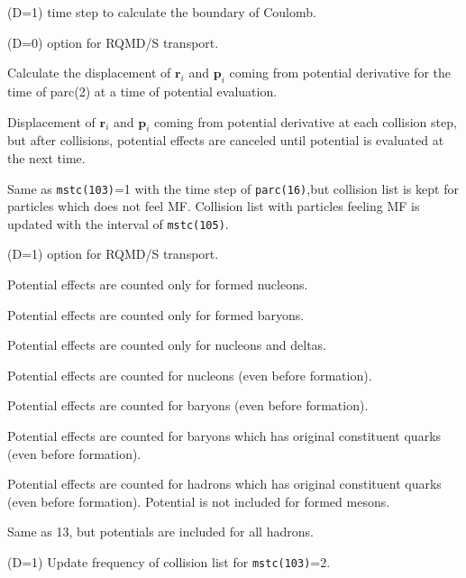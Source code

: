 \documentclass[]{article}
\newenvironment{entry}%
{\begin{list}{}{\setlength{\topsep}{0mm} \setlength{\itemsep}{0mm}
\setlength{\parskip}{0mm} \setlength{\parsep}{0mm}
\setlength{\leftmargin}{20mm} \setlength{\rightmargin}{0mm}
\setlength{\labelwidth}{18mm} \setlength{\labelsep}{2mm}}}%
{\end{list}}
\newenvironment{subentry}%
{\begin{list}{}{\setlength{\topsep}{0mm} \setlength{\itemsep}{0mm}
\setlength{\parskip}{0mm} \setlength{\parsep}{0mm}
\setlength{\leftmargin}{10mm} \setlength{\rightmargin}{0mm}
\setlength{\labelwidth}{18mm} \setlength{\labelsep}{2mm}}}%
{\end{list}}
\newcommand{\itemt}[1]{\item[{\tt #1}\hfill]}
\begin{document}
\begin{entry}
%
%
\medskip

\itemt{mstc(102) :}(D=1) time step to calculate the boundary of Coulomb.
%
%
\itemt{mstc(103) :}(D=0) option for RQMD/S transport.
 \begin{subentry}
   \itemt{$=0$ :} Calculate the displacement of $\bm{r}_i$ and $\bm{p}_i$
 	coming from potential derivative
	for the time of parc(2)
         at a time of potential evaluation.
   \itemt{$=1$ :} Displacement of $\bm{r}_i$ and $\bm{p}_i$
         coming from potential derivative at each collision step,
         but after collisions, potential effects are canceled
	 until potential is evaluated at the next time.
   \itemt{$=2$ :} Same as {\tt mstc(103)}=1 with the time step of
       {\tt parc(16)},but collision list is kept for particles which
        does not feel MF.
	Collision list with particles feeling MF is updated
       with the interval of {\tt mstc(105)}.
 \end{subentry}
\itemt{mstc(104) :}(D=1) option for RQMD/S transport.
 \begin{subentry}
   \itemt{$=0$ :} Potential effects are counted only for formed nucleons.
   \itemt{$=1$ :} Potential effects are counted only for formed baryons.
   \itemt{$=2$ :} Potential effects are counted only for nucleons and deltas.
   \itemt{$=10$ :} Potential effects are counted for nucleons
         (even before formation).
   \itemt{$=11$ :} Potential effects are counted for baryons
          (even before formation).
   \itemt{$=12$ :} Potential effects are counted for baryons
           which has original constituent quarks
          (even before formation).
   \itemt{$=13$:} Potential effects are counted for hadrons
           which has original constituent quarks
          (even before formation). 
             Potential is not included for formed mesons.
   \itemt{$=14$:} Same as 13, but potentials are included for all hadrons.

 \end{subentry}
\itemt{mstc(105) :}(D=1) Update frequency of collision list
             for {\tt mstc(103)}=2.


\end{entry}
\end{document}
